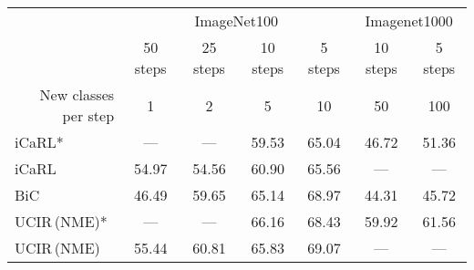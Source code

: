 \begin{table*}[t]
    \centering
    \begin{adjustbox}{max width=\textwidth}
        \begin{tabular}{@{}l|cccc|cc@{}}
            \toprule
                                                                             & \multicolumn{4}{|c|}{ImageNet100} & \multicolumn{2}{c}{Imagenet1000}                                                                                                         \\
                                                                             & 50 steps                          & 25 steps                         & 10 steps                         & 5 steps                          & 10 steps       & 5 steps        \\
            \multicolumn{1}{r|}{New classes per step}                        & 1                                 & 2                                & 5                                & 10                               & 50             & 100            \\
            \midrule
            iCaRL* \scriptsize{\citep{rebuffi2017icarl}}                     & ---                               & ---                              & 59.53                            & 65.04                            & 46.72          & 51.36          \\
            iCaRL                                                            & 54.97                             & 54.56                            & 60.90                            & 65.56                            & ---            & ---            \\
            BiC \scriptsize{\citep{wu2019bias_correction}}                   & 46.49                             & 59.65                            & 65.14                            & 68.97                            & 44.31          & 45.72          \\
            UCIR\,{\scriptsize (\ac{NME})}* \scriptsize{\citep{hou2019ucir}} & ---                               & ---                              & 66.16                            & 68.43                            & 59.92          & 61.56          \\
            UCIR\,{\scriptsize (\ac{NME})}                                   & 55.44                             & 60.81                            & 65.83                            & 69.07                            & ---            & ---            \\

\end{tabular}
\end{adjustbox}
\end{table*}
